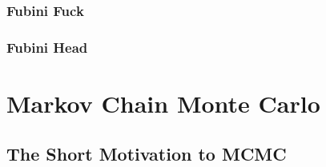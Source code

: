 \documentclass[a4paper,11pt,english]{article}
\begin{document}
			\subsubsection{Fubini Fuck}

			\subsubsection{Fubini Head}






			




	\section{Markov Chain Monte Carlo}


		\subsection{The Short Motivation to MCMC} 
\end{document}
